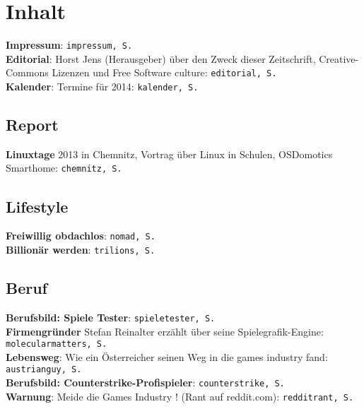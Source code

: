 \section*{Inhalt} 
\label{inhalt}

\textbf{Impressum}: \texttt{impressum, S. \pageref{impressum}}\\
\textbf{Editorial}: Horst Jens (Herausgeber) über den Zweck dieser Zeitschrift, Creative-Commons Lizenzen und Free Software culture: \texttt{editorial, S. \pageref{editorial}}\\ 
\textbf{Kalender}: Termine für 2014: \texttt{kalender, S. \pageref{kalender}}

\subsection*{Report}

\textbf{Linuxtage} 2013 in Chemnitz, Vortrag über Linux in Schulen, OSDomotics Smarthome: \texttt{chemnitz, S. \pageref{chemnitz}}\\

\subsection*{Lifestyle}

\textbf{Freiwillig obdachlos}: \texttt{nomad, S. \pageref{nomad}}\\
\textbf{Billionär werden}: \texttt{trilions, S. \pageref{trillions}}\\

\subsection*{Beruf}

\textbf{Berufsbild: Spiele Tester}: \texttt{spieletester, S. \pageref{spieletester}}\\
\textbf{Firmengründer} Stefan Reinalter erzählt über seine Spielegrafik-Engine: \texttt{molecularmatters, S. \pageref{molecularmatters}}\\
\textbf{Lebensweg}: Wie ein Österreicher seinen Weg in die games industry fand: \texttt{austrianguy, S. \pageref{austrianguy}}\\
\textbf{Berufsbild: Counterstrike-Profispieler}: \texttt{counterstrike, S. \pageref{counterstrike}}\\
\textbf{Warnung}: Meide die Games Industry ! (Rant auf reddit.com): \texttt{redditrant, S. \pageref{redditrant}}\\

